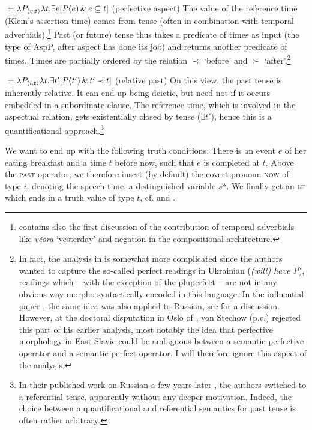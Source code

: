 \documentclass[output=paper,colorlinks,citecolor=brown]{langscibook}
\begin{document}
\ea
 ${}=\lambda P_{\langle{v,t}\rangle} \lambda t. \exists e  [P(e) \,
\& \, e \subseteq t] $ \hfill (perfective aspect) 
\z
The value of the reference time (Klein's assertion time) comes from tense (often in combination with temporal adverbials).\footnote{\citet{stechow99} contains also the first discussion of the contribution of temporal adverbials like {\textit{včora}} `yesterday' and negation in the compositional architecture.} Past (or future) tense thus takes a predicate of times as input (the type of AspP, after aspect has done its job) and returns another predicate of times.  Times are partially ordered by the relation $\prec$ `before' and $\succ$ `after'.\footnote{In fact, the analysis in \citet{stechow99} is somewhat more complicated since the authors wanted to capture the so-called perfect readings in Ukrainian ({\textit{(will) have P}}), readings which -- with the exception of the pluperfect -- are not in any obvious way morpho-syntactically encoded in this language. In the influential paper \citep{Paslawska.Stechow2003}, the same idea was also applied to Russian, see  for a discussion.  However, at the doctoral disputation in Oslo of \citet{gronndiss}, von Stechow (p.c.) rejected this part of his earlier analysis, most notably the idea that perfective morphology in East Slavic could be ambiguous between a semantic perfective operator and a semantic perfect operator. I will therefore ignore this aspect of the analysis.}


\ea\label{relpa}  ${}=\lambda P_{\langle{i,t}\rangle}\lambda t.\exists t' [P(t') \, \& \, t' \prec t]$   \hfill (relative past)
\z
On this view, the past tense is inherently relative. It can end up being deictic, but need not if it occurs embedded in a subordinate clause. The reference time, which is involved in the aspectual relation, gets existentially closed by tense ($\exists t'$), hence this is a quantificational approach.\footnote{In their published work on Russian a few years later  \citep{Paslawska.Stechow2003}, the authors switched to a referential tense, apparently without any deeper motivation. Indeed, the choice between a quantificational and referential semantics for past tense is often rather arbitrary.} 

We want to end up with the following truth conditions: There is an event $e$ of her eating breakfast and a time $t$ before now, such that $e$ is completed at $t$. Above the \textsc{past} operator, we therefore insert (by default)  the covert pronoun \textsc{now} of type $i$, denoting the speech time, a  distinguished variable $s$*. We finally get an \textsc{lf} which ends in a truth value of type $t$, cf.  and .
\end{document}
